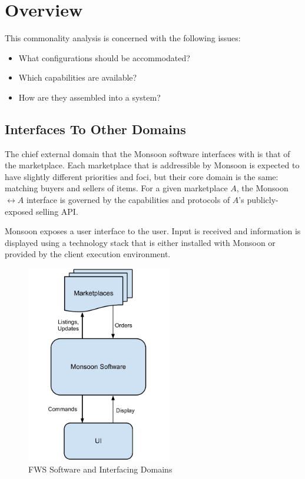 \documentclass[letterpaper,11pt]{article}
\newcounter{type}
\newcounter{item}[type]
\begin{document}
\section{Overview}

This commonality analysis is concerned with the following issues:
 
\begin{itemize}
\item What configurations should be accommodated?
\item Which capabilities are available?
\item How are they assembled into a system?
\end{itemize}
 
\subsection{Interfaces To Other Domains}

The chief external domain that the Monsoon software interfaces with is that of the marketplace.  Each marketplace that is addressible by Monsoon is expected to have slightly different priorities and foci, but their core domain is the same: matching buyers and sellers of items.  For a given marketplace $A$, the Monsoon $\leftrightarrow A$ interface is governed by the capabilities and protocols of $A$'s publicly-exposed selling API.

Monsoon exposes a user interface to the user.  Input is received and information is displayed using a technology stack that is either installed with Monsoon or provided by the client execution environment.  

\begin{figure}[h]
  \centering
  \includegraphics[width=2.5in]{Project_ExternalDomains.pdf}
  \caption{FWS Software and Interfacing Domains}
\end{figure}
\end{document}
